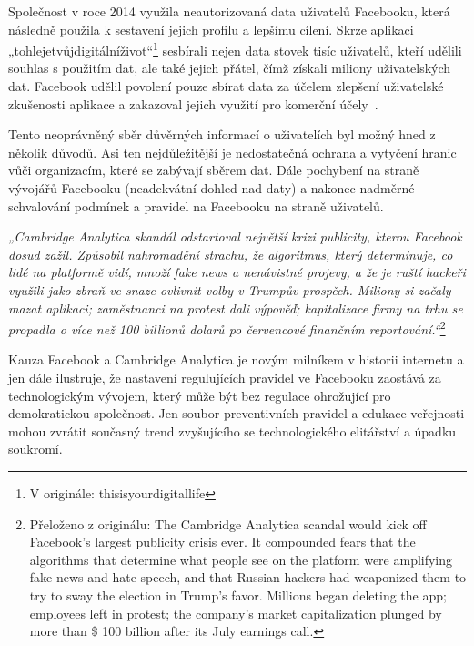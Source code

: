     Společnost v roce 2014 využila neautorizovaná data uživatelů Facebooku, která následně použila k sestavení jejich profilu a lepšímu cílení. Skrze aplikaci „tohlejetvůjdigitálníživot“\footnote{V originále: thisisyourdigitallife} sesbírali nejen data stovek tisíc uživatelů, kteří udělili souhlas s použitím dat, ale také jejich přátel, čímž získali miliony uživatelských dat. Facebook udělil povolení pouze sbírat data za účelem zlepšení uživatelské zkušenosti aplikace a zakazoval jejich využití pro komerční účely~\citep{cadwalladr_graham-harrison_2018}. 
    
    Tento neoprávněný sběr důvěrných informací o uživatelích byl možný hned z několik důvodů. Asi ten nejdůležitější je nedostatečná ochrana a vytyčení hranic vůči organizacím, které se zabývají sběrem dat. Dále pochybení na straně vývojářů Facebooku (neadekvátní dohled nad daty) a nakonec nadměrné schvalování podmínek a pravidel na Facebooku na straně uživatelů.~\citep{ur2019facebook}
    
    \setlength\parskip{5mm}
    
    \textit{„Cambridge Analytica skandál odstartoval největší krizi publicity, kterou Facebook dosud zažil. Způsobil nahromadění strachu, že algoritmus, který determinuje, co lidé na platformě vidí, množí fake news a nenávistné projevy, a že je ruští hackeři využili jako zbraň ve snaze ovlivnit volby v Trumpův prospěch. Miliony si začaly mazat aplikaci; zaměstnanci na protest dali výpověď; kapitalizace firmy na trhu se propadla o více než 100 billionů dolarů po červencové finančním reportování.“}\footnote{Přeloženo z originálu: The Cambridge Analytica scandal would kick off Facebook’s largest publicity crisis ever. It compounded fears that the algorithms that determine what people see on the platform were amplifying fake news and hate speech, and that Russian hackers had weaponized them to try to sway the election in Trump’s favor. Millions began deleting the app; employees left in protest; the company’s market capitalization plunged by more than \$ 100 billion after its July earnings call.}~\citep{hao_2021}
    
    Kauza Facebook a Cambridge Analytica je novým milníkem v historii internetu a jen dále ilustruje, že nastavení regulujících pravidel ve Facebooku zaostává za technologickým vývojem, který může být bez regulace ohrožující pro demokratickou společnost. Jen soubor preventivních pravidel a edukace veřejnosti mohou zvrátit současný trend zvyšujícího se technologického elitářství a úpadku soukromí.~\citep{common2018facebook}
    
